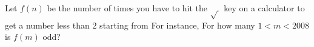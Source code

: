Let $ f(n)$ be the number of times you have to hit the $ \sqrt {\ }$ key on a calculator to get a number less than $ 2$ starting from  For instance,   For how many $ 1 < m < 2008$ is $ f(m)$ odd?